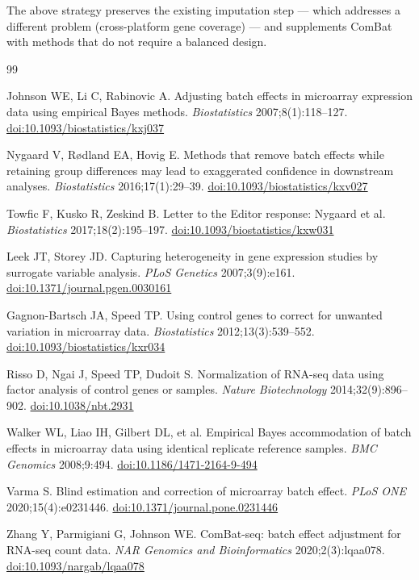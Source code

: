 \documentclass[11pt,a4paper]{article}
\newcommand{\doi}[1]{\href{https://doi.org/#1}{doi:#1}}
\begin{document}
The above strategy preserves the existing imputation step --- which
addresses a different problem (cross-platform gene coverage) ---
and supplements ComBat with methods that do not require a balanced
design.

\begin{thebibliography}{99}

Johnson WE, Li C, Rabinovic A.
Adjusting batch effects in microarray expression data using
empirical Bayes methods.
\textit{Biostatistics} 2007;8(1):118--127.
\doi{10.1093/biostatistics/kxj037}

Nygaard V, R{\o}dland EA, Hovig E.
Methods that remove batch effects while retaining group differences
may lead to exaggerated confidence in downstream analyses.
\textit{Biostatistics} 2016;17(1):29--39.
\doi{10.1093/biostatistics/kxv027}

Towfic F, Kusko R, Zeskind B.
Letter to the Editor response: Nygaard et al.
\textit{Biostatistics} 2017;18(2):195--197.
\doi{10.1093/biostatistics/kxw031}

Leek JT, Storey JD.
Capturing heterogeneity in gene expression studies by surrogate
variable analysis.
\textit{PLoS Genetics} 2007;3(9):e161.
\doi{10.1371/journal.pgen.0030161}

Gagnon-Bartsch JA, Speed TP.
Using control genes to correct for unwanted variation in
microarray data.
\textit{Biostatistics} 2012;13(3):539--552.
\doi{10.1093/biostatistics/kxr034}

Risso D, Ngai J, Speed TP, Dudoit S.
Normalization of RNA-seq data using factor analysis of control
genes or samples.
\textit{Nature Biotechnology} 2014;32(9):896--902.
\doi{10.1038/nbt.2931}

Walker WL, Liao IH, Gilbert DL, et al.
Empirical Bayes accommodation of batch effects in microarray data
using identical replicate reference samples.
\textit{BMC Genomics} 2008;9:494.
\doi{10.1186/1471-2164-9-494}

Varma S.
Blind estimation and correction of microarray batch effect.
\textit{PLoS ONE} 2020;15(4):e0231446.
\doi{10.1371/journal.pone.0231446}

Zhang Y, Parmigiani G, Johnson WE.
ComBat-seq: batch effect adjustment for RNA-seq count data.
\textit{NAR Genomics and Bioinformatics} 2020;2(3):lqaa078.
\doi{10.1093/nargab/lqaa078}


\end{thebibliography}
\end{document}

